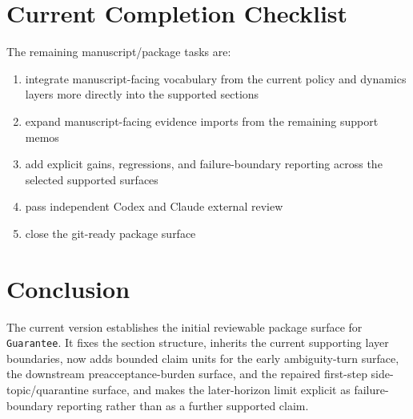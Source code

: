 \documentclass[11pt]{article}
\begin{document}
\section{Current Completion Checklist}

The remaining manuscript/package tasks are:
\begin{enumerate}
\item integrate manuscript-facing vocabulary from the current policy and dynamics
layers more directly into the supported sections
\item expand manuscript-facing evidence imports from the remaining support memos
\item add explicit gains, regressions, and failure-boundary reporting across the
selected supported surfaces
\item pass independent Codex and Claude external review
\item close the git-ready package surface
\end{enumerate}

\section{Conclusion}

The current version establishes the initial reviewable package surface for
\texttt{Guarantee}. It fixes the section structure, inherits the current supporting
layer boundaries, now adds bounded claim units for the early ambiguity-turn
surface, the downstream preacceptance-burden surface, and the repaired
first-step side-topic/quarantine surface, and makes the later-horizon limit
explicit as failure-boundary reporting rather than as a further supported claim.
\end{document}
